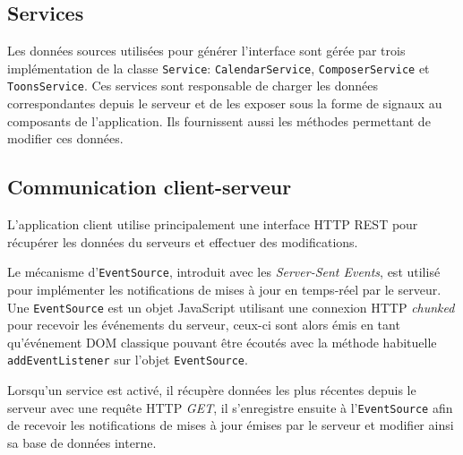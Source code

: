	\subsection{Services}
	
	Les données sources utilisées pour générer l'interface sont gérée par trois implémentation de la classe \texttt{Service}: \texttt{CalendarService}, \texttt{ComposerService} et \texttt{ToonsService}. Ces services sont responsable de charger les données correspondantes depuis le serveur et de les exposer sous la forme de signaux au composants de l'application. Ils fournissent aussi les méthodes permettant de modifier ces données.
	
	\subsection{Communication client-serveur}
	
	L'application client utilise principalement une interface HTTP REST pour récupérer les données du serveurs et effectuer des modifications.
	
	Le mécanisme d'\texttt{EventSource}, introduit avec les \emph{Server-Sent Events}, est utilisé pour implémenter les notifications de mises à jour en temps-réel par le serveur. Une \texttt{EventSource} est un objet JavaScript utilisant une connexion HTTP \emph{chunked} pour recevoir les événements du serveur, ceux-ci sont alors émis en tant qu'événement DOM classique pouvant être écoutés avec la méthode habituelle \texttt{addEventListener} sur l'objet \texttt{EventSource}.
	
	Lorsqu'un service est activé, il récupère données les plus récentes depuis le serveur avec une requête HTTP \emph{GET}, il s'enregistre ensuite à l'\texttt{EventSource} afin de recevoir les notifications de mises à jour émises par le serveur et modifier ainsi sa base de données interne.
	